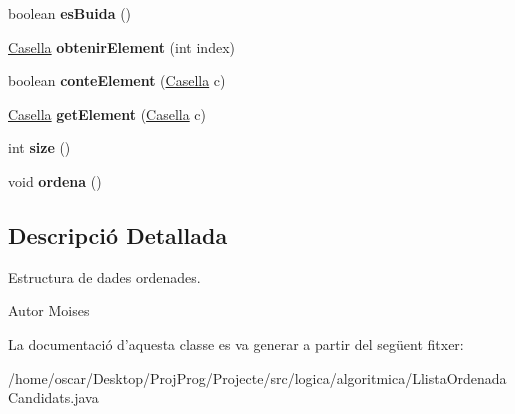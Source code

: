 \begin{DoxyCompactItemize}
\item 
\hypertarget{classlogica_1_1algoritmica_1_1_llista_ordenada_candidats_ac65c7847f389c4a729256d6f56250c32}{boolean {\bfseries es\+Buida} ()}\label{classlogica_1_1algoritmica_1_1_llista_ordenada_candidats_ac65c7847f389c4a729256d6f56250c32}

\item 
\hypertarget{classlogica_1_1algoritmica_1_1_llista_ordenada_candidats_a077c38740a99724a256a8677506bb020}{\hyperlink{classlogica_1_1algoritmica_1_1_casella}{Casella} {\bfseries obtenir\+Element} (int index)}\label{classlogica_1_1algoritmica_1_1_llista_ordenada_candidats_a077c38740a99724a256a8677506bb020}

\item 
\hypertarget{classlogica_1_1algoritmica_1_1_llista_ordenada_candidats_a211e94e69348c4e3c6a5a64991ee4364}{boolean {\bfseries conte\+Element} (\hyperlink{classlogica_1_1algoritmica_1_1_casella}{Casella} c)}\label{classlogica_1_1algoritmica_1_1_llista_ordenada_candidats_a211e94e69348c4e3c6a5a64991ee4364}

\item 
\hypertarget{classlogica_1_1algoritmica_1_1_llista_ordenada_candidats_ab9bb24ce317a3eb38e9d568ea663aa29}{\hyperlink{classlogica_1_1algoritmica_1_1_casella}{Casella} {\bfseries get\+Element} (\hyperlink{classlogica_1_1algoritmica_1_1_casella}{Casella} c)}\label{classlogica_1_1algoritmica_1_1_llista_ordenada_candidats_ab9bb24ce317a3eb38e9d568ea663aa29}

\item 
\hypertarget{classlogica_1_1algoritmica_1_1_llista_ordenada_candidats_a7778ed92542a0093478fbc36ed9ebd9e}{int {\bfseries size} ()}\label{classlogica_1_1algoritmica_1_1_llista_ordenada_candidats_a7778ed92542a0093478fbc36ed9ebd9e}

\item 
\hypertarget{classlogica_1_1algoritmica_1_1_llista_ordenada_candidats_a9cc96541804e25aebfd94bbb938e6758}{void {\bfseries ordena} ()}\label{classlogica_1_1algoritmica_1_1_llista_ordenada_candidats_a9cc96541804e25aebfd94bbb938e6758}

\end{DoxyCompactItemize}


\subsection{Descripció Detallada}
Estructura de dades ordenades. 

\begin{DoxyAuthor}{Autor}
Moises 
\end{DoxyAuthor}


La documentació d'aquesta classe es va generar a partir del següent fitxer\+:\begin{DoxyCompactItemize}
\item 
/home/oscar/\+Desktop/\+Proj\+Prog/\+Projecte/src/logica/algoritmica/Llista\+Ordenada\+Candidats.\+java\end{DoxyCompactItemize}
